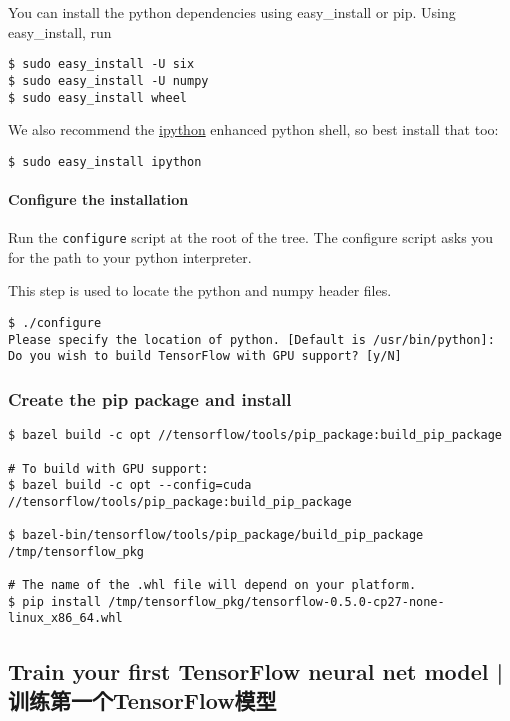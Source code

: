 You can install the python dependencies using easy_install or pip. Using easy_install, run

\begin{lstlisting}
$ sudo easy_install -U six
$ sudo easy_install -U numpy
$ sudo easy_install wheel
\end{lstlisting}

We also recommend the \href{https://ipython.org/}{ipython} enhanced python shell, so best install that too:

\begin{lstlisting}
$ sudo easy_install ipython
\end{lstlisting}

\paragraph{Configure the installation}

Run the \lstinline{configure} script at the root of the tree. The configure script asks you for the path to your python interpreter.

This step is used to locate the python and numpy header files.

\begin{lstlisting}
$ ./configure
Please specify the location of python. [Default is /usr/bin/python]:
Do you wish to build TensorFlow with GPU support? [y/N]
\end{lstlisting}

\subsubsection {Create the pip package and install}

\begin{lstlisting}
$ bazel build -c opt //tensorflow/tools/pip_package:build_pip_package

# To build with GPU support:
$ bazel build -c opt --config=cuda //tensorflow/tools/pip_package:build_pip_package

$ bazel-bin/tensorflow/tools/pip_package/build_pip_package /tmp/tensorflow_pkg

# The name of the .whl file will depend on your platform.
$ pip install /tmp/tensorflow_pkg/tensorflow-0.5.0-cp27-none-linux_x86_64.whl
\end{lstlisting}

%
\subsection {Train your first TensorFlow neural net model  |  训练第一个TensorFlow模型}

